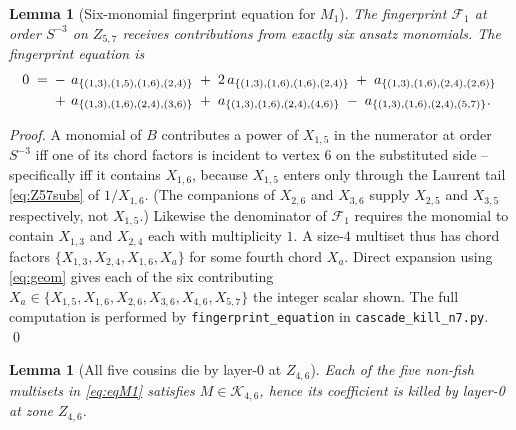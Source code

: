 \documentclass[11pt]{article}
\newtheorem{lem}[thm]{Lemma}
\theoremstyle{definition}
\begin{document}
\begin{lem}[Six-monomial fingerprint equation for $M_1$]\label{lem:eqM1}
The fingerprint $\mathcal F_1$ at order $S^{-3}$ on $Z_{5,7}$ receives
contributions from exactly six ansatz monomials. The fingerprint
equation is
\begin{equation}\label{eq:eqM1}
\hspace*{-2pt}
\begin{aligned}
0 \;=\; & -\,a_{\{(1,3),(1,5),(1,6),(2,4)\}}
        \;+\;2\,a_{\{(1,3),(1,6),(1,6),(2,4)\}}
        \;+\;a_{\{(1,3),(1,6),(2,4),(2,6)\}} \\
        & +\,a_{\{(1,3),(1,6),(2,4),(3,6)\}}
        \;+\;a_{\{(1,3),(1,6),(2,4),(4,6)\}}
        \;-\;a_{\{(1,3),(1,6),(2,4),(5,7)\}}.
\end{aligned}
\end{equation}
\end{lem}

\begin{proof}
A monomial of $B$ contributes a power of $X_{1,5}$ in the numerator at
order $S^{-3}$ iff one of its chord factors is incident to vertex $6$
on the substituted side -- specifically iff it contains $X_{1,6}$,
because $X_{1,5}$ enters only through the Laurent tail
\eqref{eq:Z57subs} of $1/X_{1,6}$. (The companions of $X_{2,6}$ and
$X_{3,6}$ supply $X_{2,5}$ and $X_{3,5}$ respectively, not $X_{1,5}$.)
Likewise the denominator of $\mathcal F_1$ requires the monomial to
contain $X_{1,3}$ and $X_{2,4}$ each with multiplicity $1$. A size-$4$
multiset thus has chord factors $\{X_{1,3}, X_{2,4}, X_{1,6}, X_a\}$ for
some fourth chord $X_a$. Direct expansion using \eqref{eq:geom} gives
each of the six contributing $X_a\in\{X_{1,5}, X_{1,6}, X_{2,6}, X_{3,6},
X_{4,6}, X_{5,7}\}$ the integer scalar shown. The full computation is
performed by \texttt{fingerprint\_equation} in
\verb|cascade_kill_n7.py|. \qed
\end{proof}

\begin{lem}[All five cousins die by layer-0 at $Z_{4,6}$]\label{lem:cousins}
Each of the five non-fish multisets in \eqref{eq:eqM1} satisfies
$M\in\mathcal{K}_{4,6}$, hence its coefficient is killed by layer-0 at
zone $Z_{4,6}$.
\end{lem}
\end{document}
